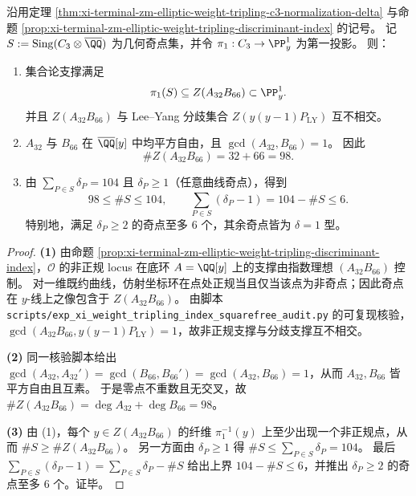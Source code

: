 \begin{theorem}[奇点投影刚性与近乎 \texorpdfstring{$\delta=1$}{delta=1} 的定量界]\label{thm:xi-terminal-zm-elliptic-weight-tripling-singularity-projection}
沿用定理 \ref{thm:xi-terminal-zm-elliptic-weight-tripling-c3-normalization-delta} 与命题 \ref{prop:xi-terminal-zm-elliptic-weight-tripling-discriminant-index} 的记号。
记 \(S:=\mathrm{Sing}(C_3\otimes\overline{\QQ})\) 为几何奇点集，并令 \(\pi_1:C_3\to\PP^1_y\) 为第一投影。
则：
\begin{enumerate}
  \item 集合论支撑满足
  \[
  \pi_1(S)\subseteq Z(A_{32}B_{66})\subset \PP^1_y.
  \]
  并且 \(Z(A_{32}B_{66})\) 与 Lee--Yang 分歧集合 \(Z(y(y-1)P_{\mathrm{LY}})\) 互不相交。
  \item \(A_{32}\) 与 \(B_{66}\) 在 \(\overline{\QQ}[y]\) 中均平方自由，且 \(\gcd(A_{32},B_{66})=1\)。
  因此
  \[
  \#Z(A_{32}B_{66})=32+66=98.
  \]
  \item 由 \(\sum_{P\in S}\delta_P=104\) 且 \(\delta_P\ge 1\)（任意曲线奇点），得到
  \[
  98\le \#S\le 104,
  \qquad
  \sum_{P\in S}(\delta_P-1)=104-\#S\le 6.
  \]
  特别地，满足 \(\delta_P\ge 2\) 的奇点至多 \(6\) 个，其余奇点皆为 \(\delta=1\) 型。
\end{enumerate}
\end{theorem}
\begin{proof}
\textbf{(1)}
由命题 \ref{prop:xi-terminal-zm-elliptic-weight-tripling-discriminant-index}，\(\mathcal O\) 的非正规 locus 在底环 \(A=\QQ[y]\) 上的支撑由指数理想 \((A_{32}B_{66})\) 控制。
对一维既约曲线，仿射坐标环在点处正规当且仅当该点为非奇点；因此奇点在 \(y\)-线上之像包含于 \(Z(A_{32}B_{66})\)。
由脚本 \texttt{scripts/exp\_xi\_weight\_tripling\_index\_squarefree\_audit.py} 的可复现核验，\(\gcd(A_{32}B_{66},y(y-1)P_{\mathrm{LY}})=1\)，故非正规支撑与分歧支撑互不相交。
\par
\textbf{(2)}
同一核验脚本给出 \(\gcd(A_{32},A_{32}')=\gcd(B_{66},B_{66}')=\gcd(A_{32},B_{66})=1\)，从而 \(A_{32},B_{66}\) 皆平方自由且互素。
于是零点不重数且无交叉，故 \(\#Z(A_{32}B_{66})=\deg A_{32}+\deg B_{66}=98\)。
\par
\textbf{(3)}
由 (1)，每个 \(y\in Z(A_{32}B_{66})\) 的纤维 \(\pi_1^{-1}(y)\) 上至少出现一个非正规点，从而 \(\#S\ge \#Z(A_{32}B_{66})\)。
另一方面由 \(\delta_P\ge 1\) 得 \(\#S\le \sum_{P\in S}\delta_P=104\)。
最后
\(
\sum_{P\in S}(\delta_P-1)=\sum_{P\in S}\delta_P-\#S
\)
给出上界 \(104-\#S\le 6\)，并推出 \(\delta_P\ge 2\) 的奇点至多 \(6\) 个。证毕。
\end{proof}

